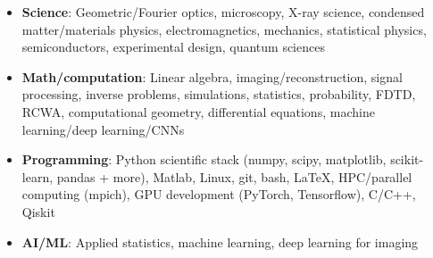 \begin{itemize}
    \item \textbf{Science}: Geometric/Fourier optics, microscopy, X-ray science, condensed matter/materials physics, electromagnetics, mechanics, statistical physics, semiconductors, experimental design, quantum sciences \par
    \item \textbf{Math/computation}: Linear algebra, imaging/reconstruction, signal processing, inverse problems, simulations, statistics, probability, FDTD, RCWA, computational geometry, differential equations, machine learning/deep learning/CNNs \par
    \item \textbf{Programming}: Python scientific stack (numpy, scipy, matplotlib, scikit-learn, pandas + more), Matlab, Linux, git, bash, \LaTeX, HPC/parallel computing (mpich), GPU development (PyTorch, Tensorflow), C/C++, Qiskit \par
    \item\textbf{AI/ML}: Applied statistics, machine learning, deep learning for imaging \par
\end{itemize}
